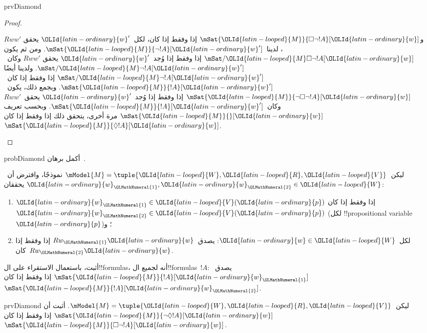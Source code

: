\documentclass[../../../include/open-logic-section]{subfiles}
\begin{document}
\begin{tagblock}{prvDiamond}
\begin{proof}
\begin{enumerate}
{      و$\mSat{{\OLId{latin-looped}{M}}}{\Box\lnot !A}[{\OLId{latin-ordinary}{w}}]$ إذا وفقط إذا كان، لكل~${\OLId{latin-ordinary}{w}}'$ يحقق
      $Rww'$، لدينا~$\mSat{{\OLId{latin-looped}{M}}}{\lnot !A}[{\OLId{latin-ordinary}{w}}']$. ومن ثم يكون
      $\mSat/{{\OLId{latin-looped}{M}}}{\Box\lnot !A}[{\OLId{latin-ordinary}{w}}]$ إذا وفقط إذا وُجد~${\OLId{latin-ordinary}{w}}'$ يحقق
      $Rww'$ وكان~$\mSat/{{\OLId{latin-looped}{M}}}{\lnot !A}[{\OLId{latin-ordinary}{w}}']$. ولدينا أيضًا
      $\mSat/{{\OLId{latin-looped}{M}}}{\lnot !A}[{\OLId{latin-ordinary}{w}}']$ إذا وفقط إذا كان~$\mSat{{\OLId{latin-looped}{M}}}{!A}[{\OLId{latin-ordinary}{w}}']$.
      وبجمع ذلك، يكون~$\mSat{{\OLId{latin-looped}{M}}}{\lnot\Box\lnot !A}[{\OLId{latin-ordinary}{w}}]$ إذا وفقط إذا
      وُجد~${\OLId{latin-ordinary}{w}}'$ يحقق~$Rww'$ وكان~$\mSat{{\OLId{latin-looped}{M}}}{!A}[{\OLId{latin-ordinary}{w}}']$. وبحسب تعريف
      $\mSat{{\OLId{latin-looped}{M}}}{}[{\OLId{latin-ordinary}{w}}]$ مرة أخرى، يتحقق ذلك إذا وفقط إذا كان
      $\mSat{{\OLId{latin-looped}{M}}}{\Diamond !A}[{\OLId{latin-ordinary}{w}}]$.}
  \end{enumerate}
\end{proof}

\begin{probtag}{probDiamond}
  أكمل برهان~.
\end{probtag}
\end{tagblock}

\begin{prob}
  ليكن~$\mModel{M} = \tuple{{\OLId{latin-looped}{W}}, {\OLId{latin-looped}{R}}, {\OLId{latin-looped}{V}}}$ نموذجًا، وافترض أن~${\OLId{latin-ordinary}{w}}_{\OLMathNumeral{1}}, {\OLId{latin-ordinary}{w}}_{\OLMathNumeral{2}} \in
  {\OLId{latin-looped}{W}}$ يحققان:
  \begin{enumerate}
  \item ${\OLId{latin-ordinary}{w}}_{\OLMathNumeral{1}} \in {\OLId{latin-looped}{V}}({\OLId{latin-ordinary}{p}})$ إذا وفقط إذا كان~${\OLId{latin-ordinary}{w}}_{\OLMathNumeral{2}} \in {\OLId{latin-looped}{V}}({\OLId{latin-ordinary}{p}})$ (لكل
    !!{propositional variable}~${\OLId{latin-ordinary}{p}}$)؛ و
  \item لكل~${\OLId{latin-ordinary}{w}} \in {\OLId{latin-looped}{W}}$: يصدق~$Rw_{\OLMathNumeral{1}}{\OLId{latin-ordinary}{w}}$ إذا وفقط إذا كان~$Rw_{\OLMathNumeral{2}}{\OLId{latin-ordinary}{w}}$.
  \end{enumerate}
  أثبت، باستعمال الاستقراء على ال!!{formula}s، أنه لجميع
  ال!!{formula}s~$!A$: يصدق~$\mSat{{\OLId{latin-looped}{M}}}{!A}[{\OLId{latin-ordinary}{w}}_{\OLMathNumeral{1}}]$ إذا وفقط إذا كان
  $\mSat{{\OLId{latin-looped}{M}}}{!A}[{\OLId{latin-ordinary}{w}}_{\OLMathNumeral{2}}]$.
\end{prob}

\begin{probtag}{prvDiamond}
  ليكن~$\mModel{M} = \tuple{{\OLId{latin-looped}{W}}, {\OLId{latin-looped}{R}}, {\OLId{latin-looped}{V}}}$. أثبت أن
  $\mSat{{\OLId{latin-looped}{M}}}{\lnot\Diamond !A}[{\OLId{latin-ordinary}{w}}]$ إذا وفقط إذا كان
  $\mSat{{\OLId{latin-looped}{M}}}{\Box\lnot!A}[{\OLId{latin-ordinary}{w}}]$.
\end{probtag}
\end{document}

